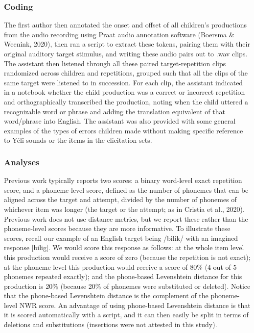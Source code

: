 \documentclass[english,,man,floatsintext]{apa6}
\begin{document}
\hypertarget{coding}{%
\subsubsection{Coding}\label{coding}}

The first author then annotated the onset and offset of all children's productions from the audio recording using Praat audio annotation software (Boersma \& Weenink, 2020), then ran a script to extract these tokens, pairing them with their original auditory target stimulus, and writing these audio pairs out to .wav clips. The assistant then listened through all these paired target-repetition clips randomized across children and repetitions, grouped such that all the clips of the same target were listened to in succession. For each clip, the assistant indicated in a notebook whether the child production was a correct or incorrect repetition and orthographically transcribed the production, noting when the child uttered a recognizable word or phrase and adding the translation equivalent of that word/phrase into English. The assistant was also provided with some general examples of the types of errors children made without making specific reference to Yélî sounds or the items in the elicitation sets.

\hypertarget{analyses}{%
\subsubsection{Analyses}\label{analyses}}

Previous work typically reports two scores: a binary word-level exact repetition score, and a phoneme-level score, defined as the number of phonemes that can be aligned across the target and attempt, divided by the number of phonemes of whichever item was longer (the target or the attempt; as in Cristia et al., 2020). Previous work does not use distance metrics, but we report these rather than the phoneme-level scores because they are more informative. To illustrate these scores, recall our example of an English target being /bilik/ with an imagined response {[}bilig{]}. We would score this response as follows: at the whole item level this production would receive a score of zero (because the repetition is not exact); at the phoneme level this production would receive a score of 80\% (4 out of 5 phonemes repeated exactly); and the phone-based Levenshtein distance for this production is 20\% (because 20\% of phonemes were substituted or deleted). Notice that the phone-based Levenshtein distance is the complement of the phoneme-level NWR score. An advantage of using phone-based Levenshtein distance is that it is scored automatically with a script, and it can then easily be split in terms of deletions and substitutions (insertions were not attested in this study).
\end{document}
